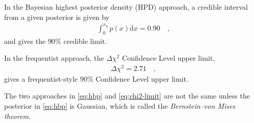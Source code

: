 In the Bayesian highest posterior density (HPD) approach, a credible interval from a given posterior is given by
%
\begin{align} \label{eq:hbp}
   \int_0^{x_0} p(x) \text{d}x = 0.90 \quad \text{,}
\end{align}
%
and gives the $90\%$ credible limit.

In the frequentist approach, the $\Delta\chi^2$ Confidence Level upper limit,
%
\begin{align} \label{eq:chi2-limit}
   \Delta\chi^2 = 2.71 \quad \text{,}
\end{align}
%
gives a frequentist-style $90\%$ Confidence Level upper limit.

The two approaches in \cref{eq:hbp} and \cref{eq:chi2-limit} are not the same unless the posterior in \cref{eq:hbp} is Gaussian, which is called the \textit{Bernstein–von Mises theorem}.

